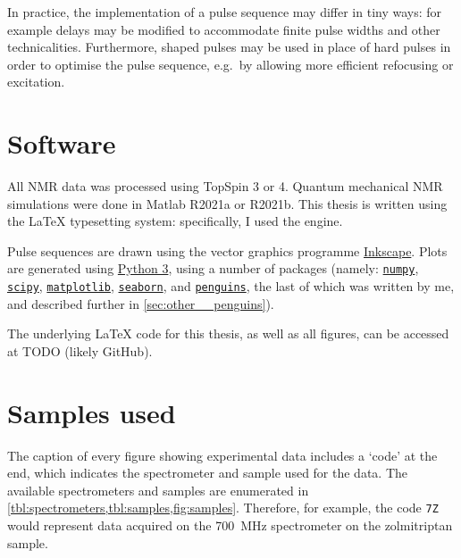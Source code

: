 In practice, the implementation of a pulse sequence may differ in tiny ways: for example delays may be modified to accommodate finite pulse widths and other technicalities.
Furthermore, shaped pulses may be used in place of hard pulses in order to optimise the pulse sequence, e.g.\ by allowing more efficient refocusing or excitation.

\section*{Software}

All NMR data was processed using TopSpin 3 or 4.
Quantum mechanical NMR simulations were done in Matlab R2021a or R2021b.
This thesis is written using the \LaTeX{} typesetting system: specifically, I used the \LuaLaTeX{} engine.

Pulse sequences are drawn using the vector graphics programme \href{https://inkscape.org/}{Inkscape}.
Plots are generated using \href{https://www.python.org/}{Python 3}, using a number of packages (namely: \href{https://github.com/numpy/numpy}{\texttt{numpy}}, \href{https://github.com/scipy/scipy}{\texttt{scipy}}, \href{https://github.com/matplotlib/matplotlib}{\texttt{matplotlib}}, \href{https://github.com/mwaskom/seaborn}{\texttt{seaborn}}, and \href{https://github.com/yongrenjie/penguins}{\texttt{penguins}}, the last of which was written by me, and described further in \cref{sec:other__penguins}).

The underlying \LaTeX{} code for this thesis, as well as all figures, can be accessed at TODO (likely GitHub).

\section*{Samples used}

The caption of every figure showing experimental data includes a `code' at the end, which indicates the spectrometer and sample used for the data.
The available spectrometers and samples are enumerated in \cref{tbl:spectrometers,tbl:samples,fig:samples}.
Therefore, for example, the code \texttt{7Z} would represent data acquired on the \SI{700}{\MHz} spectrometer on the zolmitriptan sample.


